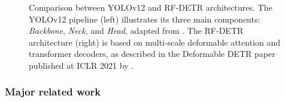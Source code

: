 \documentclass[a4paper,10pt,twocolumn]{article}
\numberwithin{figure}{section}
\numberwithin{table}{section}
\begin{document}
\begin{figure}[t]
    \centering
    \caption{Comparison between YOLOv12 and RF-DETR architectures. The YOLOv12 pipeline (left) illustrates its three main components: \textit{Backbone}, \textit{Neck}, and \textit{Head}, adapted from \citet{hidayatullah2025yolov8yolo11comprehensivearchitecture}. The RF-DETR architecture (right) is based on multi-scale deformable attention and transformer decoders, as described in the Deformable DETR paper published at ICLR 2021 by \citet{zhu2021deformabledetr}.}
    \label{fig:Arc}
\end{figure}





\subsubsection{Major related work}
\end{document}
